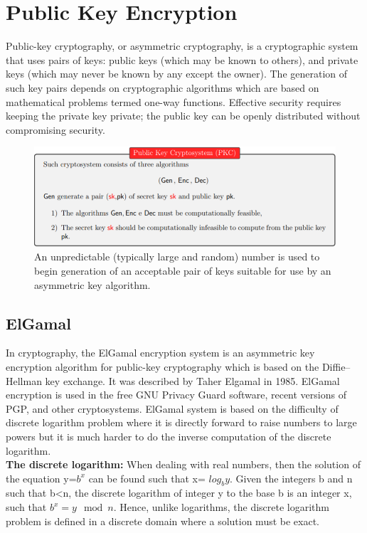 \documentclass{article}
\begin{document}
\newpage




\section{Public Key Encryption}
Public-key cryptography, or asymmetric cryptography, is a cryptographic system that uses pairs of keys: public keys (which may be known to others), and private keys (which may never be known by any except the owner). The generation of such key pairs depends on cryptographic algorithms which are based on mathematical problems termed one-way functions. Effective security requires keeping the private key private; the public key can be openly distributed without compromising security.
\begin{figure}[htb]
	\begin{center}
  		\includegraphics[width=1 \textwidth]{PublicKeyCrypto.png}
 	\end{center}
 	\caption{An unpredictable (typically large and random) number is used to begin generation of an acceptable pair of keys suitable for use by an asymmetric key algorithm.}
 	\label{ciphering}
\end{figure}
\subsection{ElGamal}
In cryptography, the ElGamal encryption system is an asymmetric key encryption algorithm for public-key cryptography which is based on the Diffie–Hellman key exchange. It was described by Taher Elgamal in 1985. ElGamal encryption is used in the free GNU Privacy Guard software, recent versions of PGP, and other cryptosystems. ElGamal system is based on the difficulty of discrete logarithm problem where it is directly forward to raise numbers to large powers but it is much harder to do the inverse computation of the discrete logarithm. \\
\textbf{The discrete logarithm:} When dealing with real numbers, then the solution of the equation y=$b^x$ can be found such that x= $log_b y $. Given the integers b and n such that b<n, the discrete logarithm of integer y to the base b is an integer x, such that $b^x=y \mod n$. Hence, unlike logarithms, the discrete logarithm problem is defined in a discrete domain where a solution must be exact.
\end{document}
